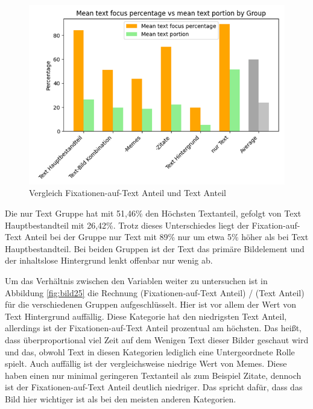 \documentclass[
    language=german, %
    thesis=seminar, %
    supervisor=postdoc, %
    multiauthor=true, %
    ]{settings/csssa-thesis}
\begin{document}
\begin{figure}[h]
    \centering
    \includegraphics[width=\linewidth,height=0.8\textheight,keepaspectratio]{figures/Bild29.png}
    \caption{Vergleich Fixationen-auf-Text Anteil und Text Anteil}\label{fig:bild24}
\end{figure}

Die nur Text Gruppe hat mit 51,46\% den Höchsten Textanteil, gefolgt von Text Hauptbestandteil 
mit 26,42\%. Trotz dieses Unterschiedes liegt der Fixation-auf-Text Anteil bei der Gruppe 
nur Text mit 89\% nur um etwa 5\% höher als bei Text Hauptbestandteil. Bei beiden Gruppen ist der 
Text das primäre Bildelement und der inhaltslose Hintergrund lenkt offenbar nur wenig ab. 

Um das Verhältnis zwischen den Variablen weiter zu untersuchen ist in Abbildung \ref{fig:bild25} die Rechnung 
(Fixationen-auf-Text Anteil) / (Text Anteil) für die verschiedenen Gruppen aufgeschlüsselt. 
Hier ist vor allem der Wert von Text Hintergrund auffällig. Diese Kategorie hat den niedrigsten 
Text Anteil, allerdings ist der Fixationen-auf-Text Anteil prozentual am höchsten. Das heißt, 
dass überproportional viel Zeit auf dem Wenigen Text dieser Bilder geschaut wird und das, 
obwohl Text in diesen Kategorien lediglich eine Untergeordnete Rolle spielt. Auch auffällig 
ist der vergleichsweise niedrige Wert von Memes. Diese haben einen nur minimal geringeren 
Textanteil als zum Beispiel Zitate, dennoch ist der Fixationen-auf-Text Anteil deutlich niedriger. 
Das spricht dafür, dass das Bild hier wichtiger ist als bei den meisten anderen Kategorien.
\end{document}
